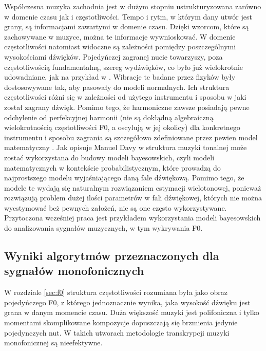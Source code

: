 \documentclass[12pt,a4paper,twoside]{mwart}
\begin{document}
Współczesna muzyka zachodnia jest w dużym stopniu ustrukturyzowana zarówno w domenie czasu jak i częstotliwości. Tempo i rytm, w którym dany utwór jest grany, są informacjami zawartymi w domenie czasu. Dzięki wzorcom, które są zachowywane w muzyce, można te informacje wywnioskować. W domenie częstotliwości natomiast widoczne są zależności pomiędzy poszczególnymi wysokościami dźwięków. Pojedyńczej zagranej nucie towarzyszy, poza częstotliwością fundamentalną, szereg wydźwięków, co było już wielokrotnie udowadniane, jak na przykład w 
\cite[1325-1326]{Transcription:Mcintyre:OnTheOscilation}.
Wibracje te badane przez fizyków były dostosowywane tak, aby pasowały do modeli normalnych. Ich struktura częstotliwości różni się w zależności od użytego instrumentu i sposobu w jaki został zagrany dźwięk. Pomimo tego, że harmoniczne zawsze posiadają pewne odchylenie od perfekcyjnej harmonii (nie są dokłądną algebraiczną wielokrotnością częstotliwości F0, a oscylują w jej okolicy) dla konkretnego instrumentu i sposobu zagrania są szczegółowo zdefiniowane przez pewien model matematyczny 
\cite[1326-1327]{Transcription:Mcintyre:OnTheOscilation}.
Jak opisuje Manuel Davy w 
\cite[203-204]{Transcription:Anssi:SignalProcessingMethods} 
struktura muzyki tonalnej może zostać wykorzystana do budowy modeli bayesowskich, czyli modeli matematycznych w kontekście probabilistycznym, które prowadzą do najprostszego modelu wyjaśniającego daną fale dźwiękową. Pomimo tego, że modele te wydają się naturalnym rozwiązaniem estymacji wielotonowej, ponieważ rozwiązują problem dużej ilości parametrów w fali dźwiękowej, których nie można wyestymować beż pewnych założeń, nie są one często wykorzystywane. Przytoczona wcześniej praca \cite{Transcription:BayesianHarmonicModels} jest przykładem wykorzystania modeli bayesowskich do analizowania sygnałów muzycznych, w tym wykrywania F0.

\subsection{Wyniki algorytmów przeznaczonych dla sygnałów monofonicznych}\label{sec:MultiPitch:monofon}
W rozdziale \ref{sec:f0} struktura częstotliwości rozumiana była jako obraz pojedyńczego F0, z którego jednoznacznie wynika, jaka wysokość dźwięku jest grana w danym momencie czasu. Duża większość muzyki jest polifoniczna i tylko momentami skomplikowane kompozycje dopuszczają się brzmienia jedynie pojedynczych nut. W takich utworach metodologie transkrypcji muzyki monofonicznej są nieefektywne.
\end{document}
